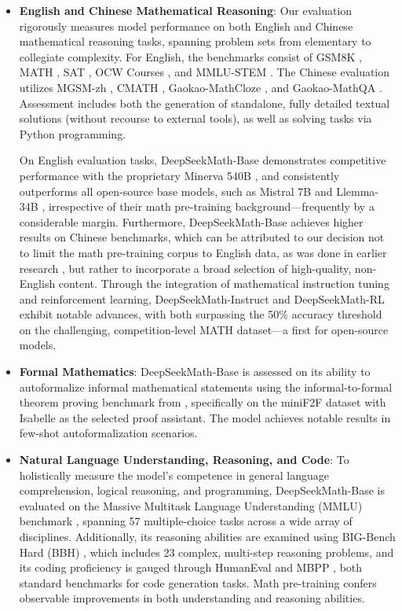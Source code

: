 \begin{itemize}[topsep=0pt]
    \item \textbf{English and Chinese Mathematical Reasoning}: Our evaluation rigorously measures model performance on both English and Chinese mathematical reasoning tasks, spanning problem sets from elementary to collegiate complexity. For English, the benchmarks consist of GSM8K \citep{gsm8k}, MATH \citep{MATH}, SAT \citep{llemma}, OCW Courses \citep{minerva}, and MMLU-STEM \citep{mmlu}. The Chinese evaluation utilizes MGSM-zh \citep{mgsm}, CMATH \citep{wei2023cmath}, Gaokao-MathCloze \citep{agieval}, and Gaokao-MathQA \citep{agieval}. Assessment includes both the generation of standalone, fully detailed textual solutions (without recourse to external tools), as well as solving tasks via Python programming.

On English evaluation tasks, DeepSeekMath-Base demonstrates competitive performance with the proprietary Minerva 540B \citep{minerva}, and consistently outperforms all open-source base models, such as Mistral 7B \citep{mistral} and Llemma-34B \citep{llemma}, irrespective of their math pre-training background—frequently by a considerable margin. Furthermore, DeepSeekMath-Base achieves higher results on Chinese benchmarks, which can be attributed to our decision not to limit the math pre-training corpus to English data, as was done in earlier research \citep{minerva,llemma}, but rather to incorporate a broad selection of high-quality, non-English content. Through the integration of mathematical instruction tuning and reinforcement learning, DeepSeekMath-Instruct and DeepSeekMath-RL exhibit notable advances, with both surpassing the 50\% accuracy threshold on the challenging, competition-level MATH dataset—a first for open-source models.

\item \textbf{Formal Mathematics}: DeepSeekMath-Base is assessed on its ability to autoformalize informal mathematical statements using the informal-to-formal theorem proving benchmark from \citep{dsp_proof}, specifically on the miniF2F dataset \citep{minif2f} with Isabelle \citep{isabelle} as the selected proof assistant. The model achieves notable results in few-shot autoformalization scenarios.
\item \textbf{Natural Language Understanding, Reasoning, and Code}: To holistically measure the model’s competence in general language comprehension, logical reasoning, and programming, DeepSeekMath-Base is evaluated on the Massive Multitask Language Understanding (MMLU) benchmark \citep{mmlu}, spanning 57 multiple-choice tasks across a wide array of disciplines. Additionally, its reasoning abilities are examined using BIG-Bench Hard (BBH) \citep{bbh}, which includes 23 complex, multi-step reasoning problems, and its coding proficiency is gauged through HumanEval \citep{codex} and MBPP \citep{mbpp}, both standard benchmarks for code generation tasks. Math pre-training confers observable improvements in both understanding and reasoning abilities.


\end{itemize}

